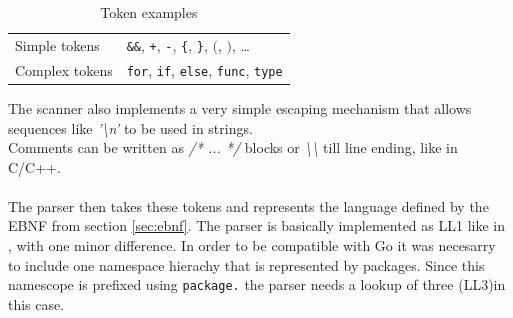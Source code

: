 \documentclass[a4paper]{scrartcl}
\begin{document}
    \begin{table}[htb]
    \centering
    \begin{tabular}{ll}
        \toprule
        Simple tokens & \texttt{\&\&}, \texttt{+}, \texttt{-}, \texttt{\{}, \texttt{\}}, \texttt{$($}, \texttt{$)$}, \dots \\
        Complex tokens & \texttt{for}, \texttt{if}, \texttt{else}, \texttt{func}, \texttt{type} \\
        \bottomrule
    \end{tabular}
    \caption{Token examples}
    \label{tbl:tokens}
    \end{table}

    The scanner also implements a very simple escaping mechanism that allows 
    sequences like \textit{'\textbackslash n'} to be used in strings. \\
    Comments can be written as \textit{/* ... */} blocks or 
    \textit{\textbackslash \textbackslash} till line ending, like in C/C++.
    \\ \\
    The parser then takes these tokens and represents the language defined by
    the EBNF from section \ref{sec:ebnf}. The parser is basically implemented 
    as LL1 like in \cite{wir96}, with one minor difference. In order to be 
    compatible with Go it was necesarry to include one namespace hierachy that 
    is represented by packages. Since this namescope is prefixed 
    using \texttt{package.} the parser needs a lookup of three (LL3)in this 
    case.
\end{document}

